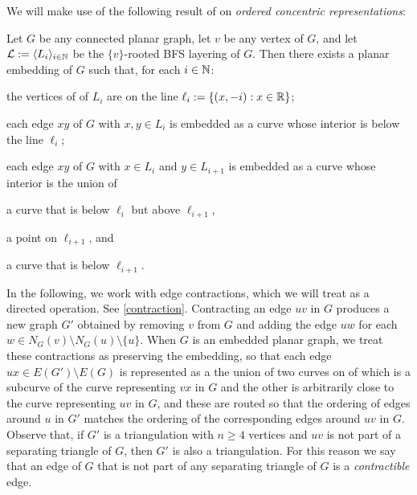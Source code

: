\documentclass{patmorin}
\begin{document}
We will make use of the following result of \citet{pupyrev:mixed} on \emph{ordered concentric representations}:

\begin{thm}\label{pupyrev}
    Let $G$ be any connected planar graph, let $v$ be any vertex of $G$, and let $\mathcal{L}:=\langle L_i\rangle_{i\in\mathbb{N}}$ be the $\{v\}$-rooted BFS layering of $G$.  Then there exists a planar embedding of $G$ such that, for each $i\in\mathbb{N}$:
    \begin{compactenum}
      \item the vertices of of $L_i$ are on the line $\ell_i:=\{(x,-i):x\in\mathbb{R}\}$;
      \item each edge $xy$ of $G$ with $x,y\in L_i$ is embedded as a curve whose interior is below the line $\ell_i$;
      \item each edge $xy$ of $G$ with $x\in L_i$ and $y\in L_{i+1}$ is embedded as a curve whose interior is the union of
      \begin{inparaenum}[(i)]
        \item a curve that is below $\ell_i$ but above $\ell_{i+1}$,
        \item a point on $\ell_{i+1}$, and
        \item a curve that is below $\ell_{i+1}$.
      \end{inparaenum}
    \end{compactenum}
\end{thm}

In the following, we work with edge contractions, which we will treat as a directed operation. See \cref{contraction}. Contracting an edge $uv$ in $G$ produces a new graph $G'$ obtained by removing $v$ from $G$ and adding the edge $uw$ for each $w\in N_G(v)\setminus N_G(u)\setminus\{u\}$.  When $G$ is an embedded planar graph, we treat these contractions as preserving the embedding, so that each edge $ux\in E(G')\setminus E(G)$ is represented as a the union of two curves on of which is a subcurve of the curve representing $vx$ in $G$ and the other is arbitrarily close to the curve representing $uv$ in $G$, and these are routed so that the ordering of edges around $u$ in $G'$ matches the ordering of the corresponding edges around $uv$ in $G$.  Observe that, if $G'$ is a triangulation with $n\ge 4$ vertices and $uv$ is not part of a separating triangle of $G$, then $G'$ is also a triangulation.  For this reason we say that an edge of $G$ that is not part of any separating triangle of $G$ is a \emph{contractible} edge.
\end{document}
